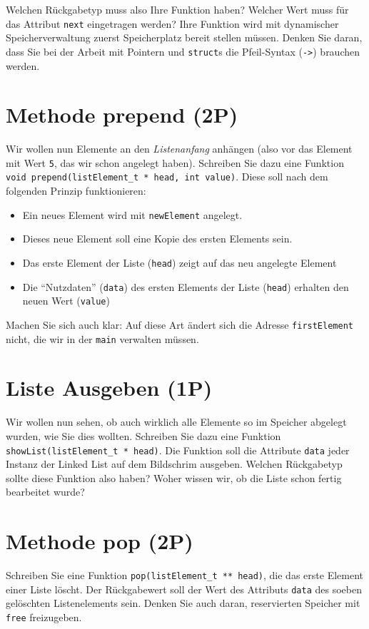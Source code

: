 \documentclass[
	ngerman,
	fontsize=10pt,
	parskip=half,
	titlepage=true,
	DIV=12
]{scrartcl}
\newcommand*{\inC}[1]{\texttt{#1}}
\begin{document}
Welchen Rückgabetyp muss also Ihre Funktion haben? Welcher Wert muss für das Attribut \texttt{next} eingetragen werden? Ihre Funktion wird mit dynamischer Speicherverwaltung zuerst Speicherplatz bereit stellen müssen. Denken Sie daran, dass Sie bei der Arbeit mit Pointern und \inC{struct}s die Pfeil-Syntax (\texttt{->}) brauchen werden.

\section{Methode prepend (2P)}
Wir wollen nun Elemente an den \emph{Listenanfang} anhängen (also vor das Element mit Wert \inC{5}, das wir schon angelegt haben). Schreiben Sie dazu eine Funktion \inC{void prepend(listElement_t * head, int value)}. Diese soll nach dem folgenden Prinzip funktionieren:

\begin{itemize}
\item Ein neues Element wird mit \texttt{newElement} angelegt.
\item Dieses neue Element soll eine Kopie des ersten Elements sein.
\item Das erste Element der Liste (\texttt{head}) zeigt auf das neu angelegte Element
\item Die \enquote{Nutzdaten} (\texttt{data}) des ersten Elements der Liste (\texttt{head}) erhalten den neuen Wert (\texttt{value})
\end{itemize}

Machen Sie sich auch klar: Auf diese Art ändert sich die Adresse \texttt{firstElement} nicht, die wir in der \texttt{main} verwalten müssen.

\section{Liste Ausgeben (1P)}
Wir wollen nun sehen, ob auch wirklich alle Elemente so im Speicher abgelegt wurden, wie Sie dies wollten. Schreiben Sie dazu eine Funktion \inC{showList(listElement_t * head)}. Die Funktion soll die Attribute \texttt{data} jeder Instanz der Linked List auf dem Bildschrim ausgeben. Welchen Rückgabetyp sollte diese Funktion also haben? Woher wissen wir, ob die Liste schon fertig bearbeitet wurde?

\section{Methode pop (2P)}
Schreiben Sie eine Funktion \inC{pop(listElement_t ** head)}, die das erste Element einer Liste löscht. Der Rückgabewert soll der Wert des Attributs \texttt{data} des soeben gelöschten Listenelements sein. Denken Sie auch daran, reservierten Speicher mit \texttt{free} freizugeben.
\end{document}
